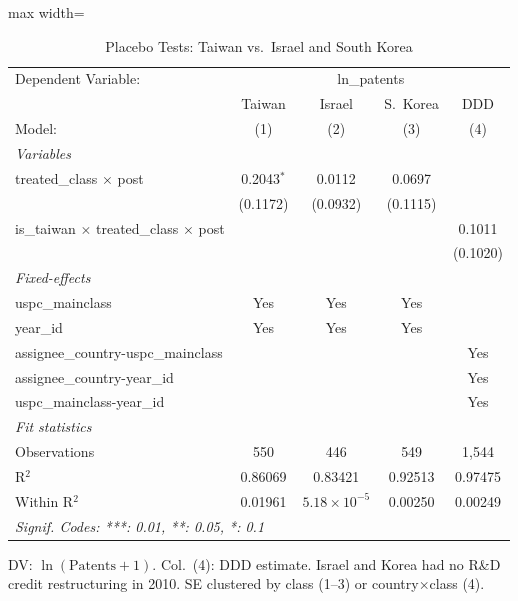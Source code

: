 
\begin{table}[htbp]
   \caption{\label{tab:placebo} Placebo Tests: Taiwan vs.\ Israel and South Korea}
   \centering
   \begin{adjustbox}{max width=\textwidth}\begin{tabular}{lcccc}
      \tabularnewline \midrule \midrule
      Dependent Variable: & \multicolumn{4}{c}{ln\_patents}\\
                                                           & Taiwan       & Israel                & S.~Korea & DDD \\   
      Model:                                               & (1)          & (2)                   & (3)      & (4)\\  
      \midrule
      \emph{Variables}\\
      treated\_class $\times$ post                         & 0.2043$^{*}$ & 0.0112                & 0.0697   &   \\   
                                                           & (0.1172)     & (0.0932)              & (0.1115) &   \\   
      is\_taiwan $\times$ treated\_class $\times$ post     &              &                       &          & 0.1011\\   
                                                           &              &                       &          & (0.1020)\\   
      \midrule
      \emph{Fixed-effects}\\
      uspc\_mainclass                                      & Yes          & Yes                   & Yes      & \\  
      year\_id                                             & Yes          & Yes                   & Yes      & \\  
      assignee\_country-uspc\_mainclass                    &              &                       &          & Yes\\  
      assignee\_country-year\_id                           &              &                       &          & Yes\\  
      uspc\_mainclass-year\_id                             &              &                       &          & Yes\\  
      \midrule
      \emph{Fit statistics}\\
      Observations                                         & 550          & 446                   & 549      & 1,544\\  
      R$^2$                                                & 0.86069      & 0.83421               & 0.92513  & 0.97475\\  
      Within R$^2$                                         & 0.01961      & $5.18\times 10^{-5}$  & 0.00250  & 0.00249\\  
      \midrule \midrule
      \multicolumn{5}{l}{\emph{Signif. Codes: ***: 0.01, **: 0.05, *: 0.1}}\\
   \end{tabular}\end{adjustbox}
   
   \par \raggedright 
   DV: $\ln(\text{Patents}+1)$. Col.\ (4): DDD estimate. Israel and Korea had no R\&D credit restructuring in 2010. SE clustered by class (1--3) or country$\times$class (4).
\end{table}


